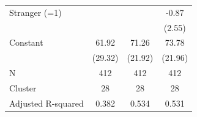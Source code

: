 {\begin{tabular}{l*{3}{c}}
Stranger (=1)       &                     &                     &       -0.87         \\
                    &                     &                     &      (2.55)         \\
Constant            &       61.92\sym{**} &       71.26\sym{***}&       73.78\sym{***}\\
                    &     (29.32)         &     (21.92)         &     (21.96)         \\
\midrule
N                   &         412         &         412         &         412         \\
Cluster             &          28         &          28         &          28         \\
Adjusted R-squared  &       0.382         &       0.534         &       0.531         \\
\bottomrule
\end{tabular}
}
